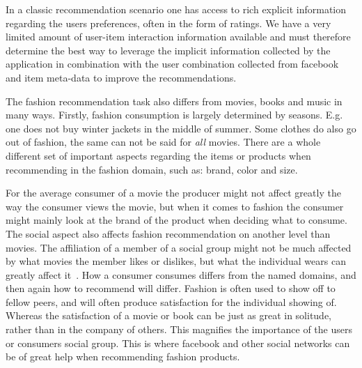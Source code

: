 In a classic recommendation scenario one has access to rich explicit information regarding the users preferences, often in the form of ratings. We have a very limited amount of user-item interaction information available and must therefore determine the best way to leverage the implicit information collected by the application in combination with the user combination collected from facebook and item meta-data to improve the recommendations.

The fashion recommendation task also differs from movies, books and music in many ways.
Firstly, fashion consumption is largely determined by seasons.
E.g. one does not buy winter jackets in the middle of summer.
Some clothes do also go out of fashion, the same can not be said for \emph{all} movies.
There are a whole different set of important aspects regarding the items or products when recommending in the fashion domain, such as: brand, color and size.

For the average consumer of a movie the producer might not affect greatly the way the consumer views the movie, but when it comes to fashion the consumer might mainly look at the brand of the product when deciding what to consume.
The social aspect also affects fashion recommendation on another level than movies.
The affiliation of a member of a social group might not be much affected by what movies the member likes or dislikes, but what the individual wears can greatly affect it~\cite{vignali2009fashion}.
How a consumer consumes differs from the named domains, and then again how to recommend will differ.
Fashion is often used to show off to fellow peers, and will often produce satisfaction for the individual showing of.
Whereas the satisfaction of a movie or book can be just as great in solitude, rather than in the company of others.
This magnifies the importance of the users or consumers social group.
This is where facebook and other social networks can be of great help when recommending fashion products.


